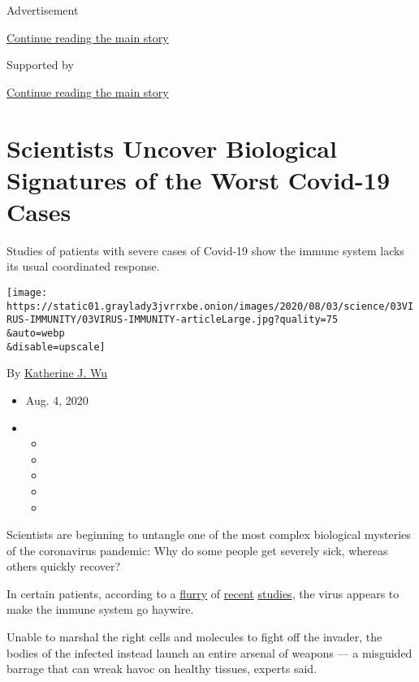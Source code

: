 Advertisement

\protect\hyperlink{after-top}{Continue reading the main story}

Supported by

\protect\hyperlink{after-sponsor}{Continue reading the main story}

\hypertarget{scientists-uncover-biological-signatures-of-the-worst-covid-19-cases}{%
\section{Scientists Uncover Biological Signatures of the Worst Covid-19
Cases}\label{scientists-uncover-biological-signatures-of-the-worst-covid-19-cases}}

Studies of patients with severe cases of Covid-19 show the immune system
lacks its usual coordinated response.

\texttt{[image: https://static01.graylady3jvrrxbe.onion/images/2020/08/03/science/03VIRUS-IMMUNITY/03VIRUS-IMMUNITY-articleLarge.jpg?quality=75\\\&auto=webp\\\&disable=upscale]}

By
\href{https://www.nytimes3xbfgragh.onion/by/katherine-j--wu}{Katherine
J. Wu}

\begin{itemize}
\item
  Aug. 4, 2020
\item
  \begin{itemize}
  \item
  \item
  \item
  \item
  \item
  \end{itemize}
\end{itemize}

Scientists are beginning to untangle one of the most complex biological
mysteries of the coronavirus pandemic: Why do some people get severely
sick, whereas others quickly recover?

In certain patients, according to a
\href{https://www.nature.com/articles/s41586-020-2588-y}{flurry} of
\href{https://science.sciencemag.org/content/early/2020/07/15/science.abc8511}{recent}
\href{https://immunology.sciencemag.org/content/5/49/eabd7114}{studies},
the virus appears to make the immune system go haywire.

Unable to marshal the right cells and molecules to fight off the
invader, the bodies of the infected instead launch an entire arsenal of
weapons --- a misguided barrage that can wreak havoc on healthy tissues,
experts said.

